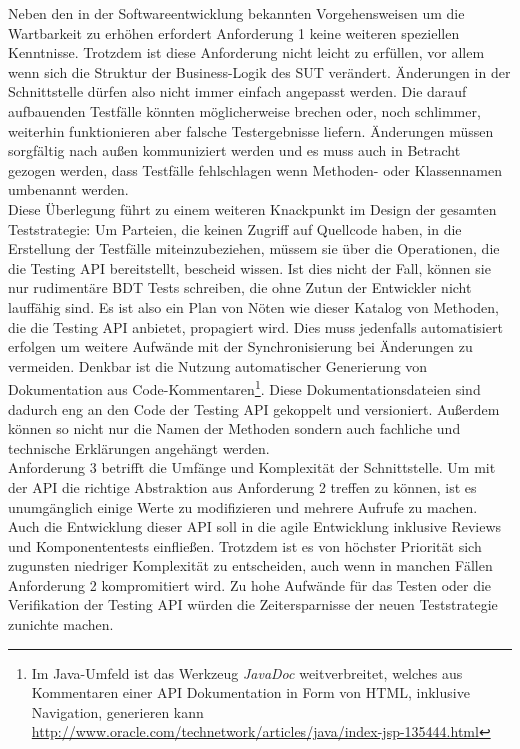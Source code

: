 Neben den in der Softwareentwicklung bekannten Vorgehensweisen um die  Wartbarkeit zu erhöhen erfordert Anforderung 1 keine weiteren speziellen Kenntnisse. Trotzdem ist diese Anforderung nicht leicht zu erfüllen, vor allem wenn sich die Struktur der Business-Logik des \Gls{SUT} verändert. Änderungen in der Schnittstelle dürfen also nicht immer einfach angepasst werden. Die darauf aufbauenden Testfälle könnten möglicherweise brechen oder, noch schlimmer, weiterhin funktionieren aber falsche Testergebnisse liefern. Änderungen müssen sorgfältig nach außen kommuniziert werden und es muss auch in Betracht gezogen werden, dass Testfälle fehlschlagen wenn Methoden- oder Klassennamen umbenannt werden.\\
Diese Überlegung führt zu einem weiteren Knackpunkt im Design der gesamten Teststrategie: Um Parteien, die keinen Zugriff auf Quellcode haben, in die Erstellung der Testfälle miteinzubeziehen, müssem sie über die Operationen, die die Testing API bereitstellt, bescheid wissen. Ist dies nicht der Fall, können sie nur rudimentäre \Gls{BDT} Tests schreiben, die ohne Zutun der Entwickler nicht lauffähig sind. Es ist also ein Plan von Nöten wie dieser Katalog von Methoden, die die Testing API anbietet, propagiert wird. Dies muss jedenfalls automatisiert erfolgen um weitere Aufwände mit der Synchronisierung bei Änderungen zu vermeiden. Denkbar ist die Nutzung automatischer Generierung von Dokumentation aus Code-Kommentaren\footnote{Im Java-Umfeld ist das Werkzeug \textit{JavaDoc} weitverbreitet, welches aus Kommentaren einer API Dokumentation in Form von HTML, inklusive Navigation, generieren kann \url{http://www.oracle.com/technetwork/articles/java/index-jsp-135444.html}}. Diese Dokumentationsdateien sind dadurch eng an den Code der Testing API gekoppelt und versioniert. Außerdem können so nicht nur die Namen der Methoden sondern auch fachliche und technische Erklärungen angehängt werden.\\
Anforderung 3 betrifft die Umfänge und Komplexität der Schnittstelle. Um mit der API die richtige Abstraktion aus Anforderung 2 treffen zu können, ist es unumgänglich einige Werte zu modifizieren und mehrere Aufrufe zu machen. Auch die Entwicklung dieser API soll in die agile Entwicklung inklusive \Glspl{Review} und Komponententests einfließen. Trotzdem ist es von höchster Priorität sich zugunsten niedriger Komplexität zu entscheiden, auch wenn in manchen Fällen Anforderung 2 kompromitiert wird. Zu hohe Aufwände für das Testen oder die Verifikation der Testing API würden die Zeitersparnisse der neuen Teststrategie zunichte machen.

